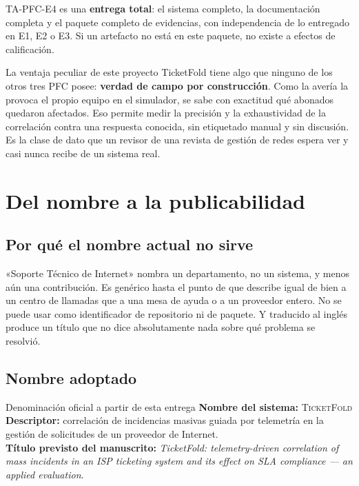 \documentclass[11pt,a4paper]{article}
\begin{document}
TA-PFC-E4 es una \textbf{entrega total}: el sistema completo, la documentación completa y el paquete completo de evidencias, con independencia de lo entregado en E1, E2 o E3. Si un artefacto no está en este paquete, no existe a efectos de calificación.

\begin{aviso}{La ventaja peculiar de este proyecto}
	TicketFold tiene algo que ninguno de los otros tres PFC posee: \textbf{verdad de campo por construcción}. Como la avería la provoca el propio equipo en el simulador, se sabe con exactitud qué abonados quedaron afectados. Eso permite medir la precisión y la exhaustividad de la correlación contra una respuesta conocida, sin etiquetado manual y sin discusión. Es la clase de dato que un revisor de una revista de gestión de redes espera ver y casi nunca recibe de un sistema real.
\end{aviso}

\section{Del nombre a la publicabilidad}

\subsection{Por qué el nombre actual no sirve}

«Soporte Técnico de Internet» nombra un departamento, no un sistema, y menos aún una contribución. Es genérico hasta el punto de que describe igual de bien a un centro de llamadas que a una mesa de ayuda o a un proveedor entero. No se puede usar como identificador de repositorio ni de paquete. Y traducido al inglés produce un título que no dice absolutamente nada sobre qué problema se resolvió.

\subsection{Nombre adoptado}

\begin{aviso}{Denominación oficial a partir de esta entrega}
	\textbf{Nombre del sistema:} \textsc{TicketFold}\\[6pt]
	\textbf{Descriptor:} correlación de incidencias masivas guiada por telemetría en la gestión de solicitudes de un proveedor de Internet.\\[6pt]
	\textbf{Título previsto del manuscrito:} \emph{TicketFold: telemetry-driven correlation of mass incidents in an ISP ticketing system and its effect on SLA compliance --- an applied evaluation}.
\end{aviso}
\end{document}

